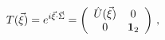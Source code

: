 \begin{equation}\label{Uxi}
T(\vec{\xi})=e^{i\vec{\xi}\cdot \vec{\Sigma}}=\left(
\begin{array}{cc}
\hat U(\vec{\xi})&0\\
0&{\bf 1}_2
\end{array}\right)\,,
\end{equation}

